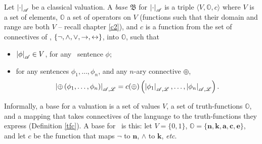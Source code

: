 \begin{definition}[Base]
Let $\left|\cdot\right|_{\mathscr{A}}$ be a classical valuation. A \emph{base} $\mathfrak{B}$ for $\left|\cdot\right|_{\mathscr{A}}$ is a triple $\langle V, \mathbb{O}, c\rangle$ where $V$ is a set of elements, $\mathbb{O}$ a set of operators on $V$ (functions such that their domain and range are both $V$ – recall chapter \ref{c2}), and $c$ is a function from the set of connectives of \lone, $\{\neg,\wedge,\vee,\to,\leftrightarrow\}$, into $\mathbb{O}$, such that \begin{itemize}
	\item $\left|\phi\right|_{\mathscr{A}} \in V$, for any \lone\ sentence $\phi$;
	\item for any sentences $\phi_{1},\ldots,\phi_{n}$, and any $n$-ary connective $\oplus$, $$\left|\oplus\left(\phi_{1},\ldots,\phi_{n}\right)\right|_{\mathscr{A,L}} = c(\oplus)\left(\left|\phi_{1}\right|_{\mathscr{A,L}},\ldots,\left|\phi_{n}\right|_{\mathscr{A,L}}\right).$$
\end{itemize} \citep[27]{bevpospa}
\end{definition}
Informally, a base for a valuation is a set of values $V$, a set of truth-functions $\mathbb{O}$, and a mapping that takes connectives of the language to the truth-functions they express (Definition \ref{tfc}). A base for \lone\ is this: let $V = \{0,1\}$, $\mathbb{O} = \{\mathbf{n},\mathbf{k},\mathbf{a},\mathbf{c},\mathbf{e}\}$, and let $c$ be the function that maps $\neg$ to $\mathbf{n}$, $\wedge$ to $\mathbf{k}$, \emph{etc}.




